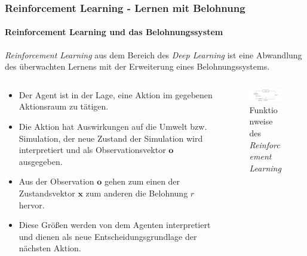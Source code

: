 \documentclass[10pt,t,aspectratio=1610]{beamer}
\newcommand{\ChapterRl}{Reinforcement Learning - Lernen mit Belohnung}
\begin{document}
\begin{frame}
	\frametitle{\ChapterRl}
	\framesubtitle{Reinforcement Learning und das Belohnungssystem}
	\vspace{0.3cm}
	\textit{Reinforcement Learning} aus dem Bereich des \textit{Deep Learning} ist eine Abwandlung des überwachten Lernens mit der Erweiterung eines Belohnungssystems.
	\begin{columns}[T,onlytextwidth]
		\begin{column}{0.5\textwidth}
			\vspace{0.2cm}
			\begin{itemize}
			  \item Der Agent ist in der Lage, eine Aktion im gegebenen Aktionsraum zu tätigen.
			  \item Die Aktion hat Auswirkungen auf die Umwelt bzw. Simulation, der neue Zustand der Simulation wird interpretiert und als Observationsvektor $\boldsymbol{o}$ ausgegeben.
			  \item Aus der Observation $\boldsymbol{o}$ gehen zum einen der Zustandsvektor $\boldsymbol{x}$ zum anderen die Belohnung $r$ hervor.
			  \item Diese Größen werden von dem Agenten interpretiert und dienen als neue Entscheidungsgrundlage der nächsten Aktion.
			\end{itemize}
		\end{column}
		\hspace{-0.5cm}
		\begin{column}{0.45\textwidth}
			\vspace{1cm}
			\begin{figure}[H] %
				\centering
				\includegraphics[width=8cm]{figures/RL_Chart_pres.pdf}
				\caption{Funktionweise des \textit{Reinforcement Learning}}
				\label{fig:rl}
			\end{figure}
		\end{column}
	\end{columns}
\end{frame}

\end{document}
